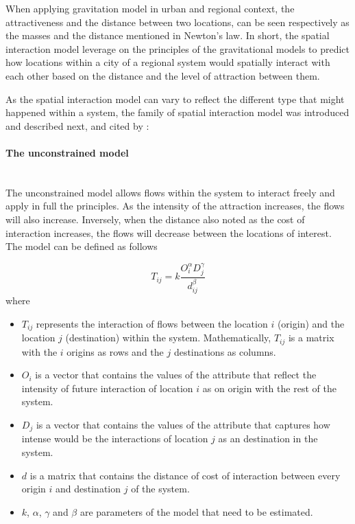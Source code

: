 \documentclass{article}
\begin{document}
When applying gravitation model in urban and regional context, the attractiveness and the distance between two locations, can be seen respectively as the masses and the distance mentioned in Newton's law. In short, the spatial interaction model leverage on the principles of the gravitational models to predict how locations within a city of a regional system would spatially interact with each other based on the distance and the level of attraction between them.

As the spatial interaction model can vary to reflect the different type that might happened within a system, the family of spatial interaction model was introduced and described next, \citep{wilsonEntropyUrbanRegional2011} and \citep{wilsonFamilySpatialInteraction1971} cited by \citep{battyUrbanModellingAlgorithms1976}:

\paragraph{The unconstrained model}\mbox{}\\

The unconstrained model allows flows within the system to interact freely and apply in full the principles. As the intensity of the attraction increases, the flows will also increase. Inversely, when the distance also noted as the cost of interaction increases, the flows will decrease between the locations of interest. The model can be defined as follows \citep{arcauteSpatialInteractionModelling2023}

\[T_{ij} = k \frac{O_i^\alpha  D_j^\gamma}{ d_{ij}^\beta}\] where 

\begin{itemize}
  \item $T_{ij}$ represents the interaction of flows between the location $i$ (origin) and the location $j$ (destination) within the system. Mathematically,  $T_{ij}$ is a matrix with the $i$ origins as rows and the $j$ destinations as columns.
  \item $O_{i}$ is a vector that contains the values of the attribute that reflect the intensity of future interaction of location $i$ as on origin with the rest of the system.
  \item $D_{j}$ is a vector that contains the values of the attribute that captures how intense would be the interactions of location $j$ as an destination in the system.
    \item $d$ is a matrix that contains the distance of cost of interaction between every origin $i$ and destination $j$ of the system.
    \item $k$, $\alpha$, $\gamma$ and $\beta$ are parameters of the model that need to be estimated.
\end{itemize}
\end{document}
